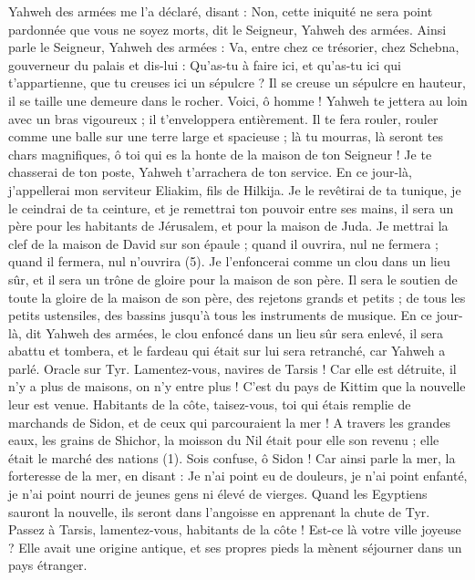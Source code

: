 \begin{multicols}{2}
Yahweh des armées me l’a déclaré, disant : Non, cette iniquité ne sera point pardonnée que vous ne soyez morts, dit le Seigneur, Yahweh des armées.
Ainsi parle le Seigneur, Yahweh des armées : Va, entre chez ce trésorier, chez Schebna, gouverneur du palais et dis-lui :
Qu'as-tu à faire ici, et qu’as-tu ici qui t'appartienne, que tu creuses ici un sépulcre ? Il se creuse un sépulcre en hauteur, il se taille une demeure dans le rocher.
Voici, ô homme ! Yahweh te jettera au loin avec un bras vigoureux ; il t’enveloppera entièrement.
Il te fera rouler, rouler comme une balle sur une terre large et spacieuse ; là tu mourras, là seront tes chars magnifiques, ô toi qui es la honte de la maison de ton Seigneur !
Je te chasserai de ton poste, Yahweh t’arrachera de ton service.
En ce jour-là, j'appellerai mon serviteur Eliakim, fils de Hilkija.
Je le revêtirai de ta tunique, je le ceindrai de ta ceinture, et je remettrai ton pouvoir entre ses mains, il sera un père pour les habitants de Jérusalem, et pour la maison de Juda.
Je mettrai la clef de la maison de David sur son épaule ; quand il ouvrira, nul ne fermera ; quand il fermera, nul n’ouvrira (5).
Je l’enfoncerai comme un clou dans un lieu sûr, et il sera un trône de gloire pour la maison de son père.
Il sera le soutien de toute la gloire de la maison de son père, des rejetons grands et petits ; de tous les petits ustensiles, des bassins jusqu’à tous les instruments de musique.
En ce jour-là, dit Yahweh des armées, le clou enfoncé dans un lieu sûr sera enlevé, il sera abattu et tombera, et le fardeau qui était sur lui sera retranché, car Yahweh a parlé.
\VerseOne{}Oracle sur Tyr. Lamentez-vous, navires de Tarsis ! Car elle est détruite, il n'y a plus de maisons, on n'y entre plus ! C’est du pays de Kittim que la nouvelle leur est venue.
Habitants de la côte, taisez-vous, toi qui étais remplie de marchands de Sidon, et de ceux qui parcouraient la mer !
A travers les grandes eaux, les grains de Shichor, la moisson du Nil était pour elle son revenu ; elle était le marché des nations (1).
Sois confuse, ô Sidon ! Car ainsi parle la mer, la forteresse de la mer, en disant : Je n'ai point eu de douleurs, je n'ai point enfanté, je n'ai point nourri de jeunes gens ni élevé de vierges.
Quand les Egyptiens sauront la nouvelle, ils seront dans l’angoisse en apprenant la chute de Tyr.
Passez à Tarsis, lamentez-vous, habitants de la côte !
Est-ce là votre ville joyeuse ? Elle avait une origine antique, et ses propres pieds la mènent séjourner dans un pays étranger.

\end{multicols}
